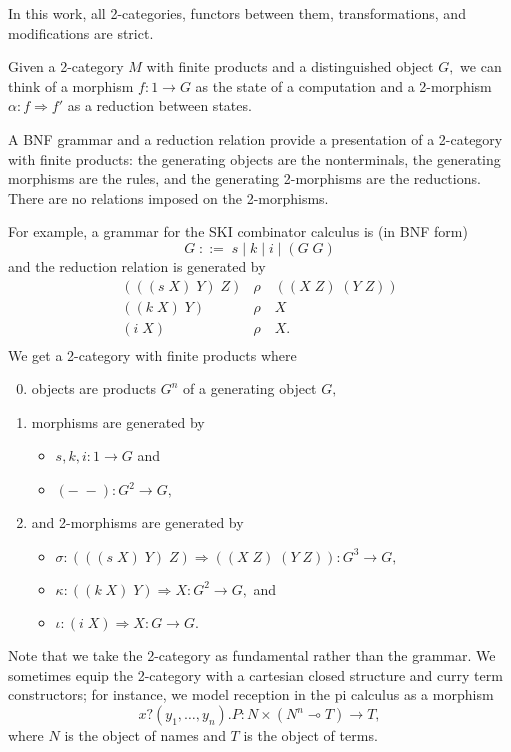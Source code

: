 \documentclass[]{acm_proc_article-sp}
\numberwithin{equation}{subsection}
\begin{document}
In this work, all 2-categories, functors between them, transformations, and modifications are strict.

Given a 2-category $M$ with finite products and a distinguished object $G,$ we can think of a morphism $f\colon 1 \to G$ as the state of a computation and a 2-morphism $\alpha\colon f \Rightarrow f'$ as a reduction between states.

A BNF grammar and a reduction relation provide a presentation of a 2-category with finite products: the generating objects are the nonterminals, the generating morphisms are the rules, and the generating 2-morphisms are the reductions.  There are no relations imposed on the 2-morphisms.

For example, a grammar for the SKI combinator calculus is (in BNF form)
\[ G\; ::=\; s\; |\; k\; |\; i\; |\; (G\; G) \]
and the reduction relation is generated by
\[\begin{array}{rl}
  (((s\; X)\; Y)\; Z) & \rho\quad ((X\; Z)\; (Y\; Z))\\
  ((k\; X)\; Y) & \rho\quad X\\
  (i\; X) & \rho\quad X.\\
\end{array}\]
We get a 2-category with finite products where
\begin{enumerate}
  \setcounter{enumi}{-1}
  \item objects are products $G^n$ of a generating object $G,$
  \item morphisms are generated by
  \begin{itemize}
    \item $s, k, i\colon 1 \to G$ and
    \item $(-\;-)\colon G^2 \to G,$
  \end{itemize}
  \item and 2-morphisms are generated by
  \begin{itemize}
    \item $\sigma\colon (((s\; X)\; Y)\; Z) \Rightarrow ((X\; Z)\; (Y\; Z)) \colon {G^3 \to G},$
    \item $\kappa\colon ((k\; X)\; Y) \Rightarrow X \colon {G^2 \to G},$ and
    \item $\iota\colon (i\; X) \Rightarrow X \colon {G \to G}.$
  \end{itemize}
\end{enumerate}

Note that we take the 2-category as fundamental rather than the grammar.  We sometimes equip the 2-category with a cartesian closed structure and curry term constructors; for instance, we model reception in the pi calculus as a morphism
\[ x?(y_1, \ldots, y_n).P\colon N \times (N^n \multimap T) \to T, \]
where $N$ is the object of names and $T$ is the object of terms.  
\end{document}
